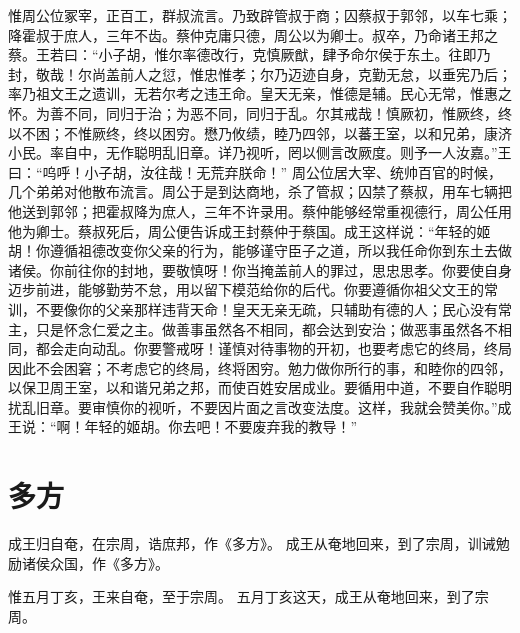 \documentclass[a4paper,12pt,UTF8,twoside]{ctexbook}
\begin{document}
惟周公位冢宰，正百工，群叔流言。乃致辟管叔于商；囚蔡叔于郭邻，以车七乘；降霍叔于庶人，三年不齿。蔡仲克庸只德，周公以为卿士。叔卒，乃命诸王邦之蔡。王若曰：“小子胡，惟尔率德改行，克慎厥猷，肆予命尔侯于东土。往即乃封，敬哉！尔尚盖前人之愆，惟忠惟孝；尔乃迈迹自身，克勤无怠，以垂宪乃后；率乃祖文王之遗训，无若尔考之违王命。皇天无亲，惟德是辅。民心无常，惟惠之怀。为善不同，同归于治；为恶不同，同归于乱。尔其戒哉！慎厥初，惟厥终，终以不困；不惟厥终，终以困穷。懋乃攸绩，睦乃四邻，以蕃王室，以和兄弟，康济小民。率自中，无作聪明乱旧章。详乃视听，罔以侧言改厥度。则予一人汝嘉。”王曰：“呜呼！小子胡，汝往哉！无荒弃朕命！”
周公位居大宰、统帅百官的时候，几个弟弟对他散布流言。周公于是到达商地，杀了管叔；囚禁了蔡叔，用车七辆把他送到郭邻；把霍叔降为庶人，三年不许录用。蔡仲能够经常重视德行，周公任用他为卿士。蔡叔死后，周公便告诉成王封蔡仲于蔡国。成王这样说：“年轻的姬胡！你遵循祖德改变你父亲的行为，能够谨守臣子之道，所以我任命你到东土去做诸侯。你前往你的封地，要敬慎呀！你当掩盖前人的罪过，思忠思孝。你要使自身迈步前进，能够勤劳不怠，用以留下模范给你的后代。你要遵循你祖父文王的常训，不要像你的父亲那样违背天命！皇天无亲无疏，只辅助有德的人；民心没有常主，只是怀念仁爱之主。做善事虽然各不相同，都会达到安治；做恶事虽然各不相同，都会走向动乱。你要警戒呀！谨慎对待事物的开初，也要考虑它的终局，终局因此不会困窘；不考虑它的终局，终将困穷。勉力做你所行的事，和睦你的四邻，以保卫周王室，以和谐兄弟之邦，而使百姓安居成业。要循用中道，不要自作聪明扰乱旧章。要审慎你的视听，不要因片面之言改变法度。这样，我就会赞美你。”成王说：“啊！年轻的姬胡。你去吧！不要废弃我的教导！”

\chapter{多方}

成王归自奄，在宗周，诰庶邦，作《多方》。
成王从奄地回来，到了宗周，训诫勉励诸侯众国，作《多方》。

惟五月丁亥，王来自奄，至于宗周。
五月丁亥这天，成王从奄地回来，到了宗周。
\end{document}
